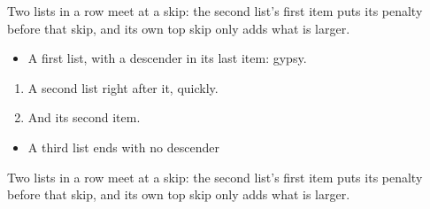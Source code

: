 \documentclass{article}
\begin{document}
Two lists in a row meet at a skip: the second list's first item puts its penalty before that skip, and its own top skip only adds what is larger.

\begin{itemize}
\item A first list, with a descender in its last item: gypsy.
\end{itemize}
\begin{enumerate}
\item A second list right after it, quickly.
\item And its second item.
\end{enumerate}
\begin{itemize}
\item A third list ends with no descender
\end{itemize}

Two lists in a row meet at a skip: the second list's first item puts its penalty before that skip, and its own top skip only adds what is larger.
\end{document}
